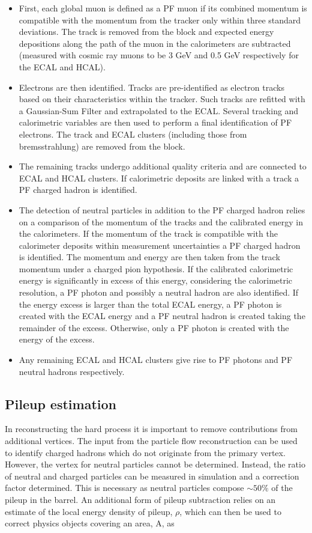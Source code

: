 \begin{itemize}
\item First, each global muon is defined as a PF muon if its combined momentum is compatible with the momentum 
from the tracker only within three standard deviations. The track is removed from the block and expected energy depositions
along the path of the muon in the calorimeters are subtracted (measured with cosmic ray muons to be 3 GeV and 0.5 GeV respectively for the 
ECAL and HCAL).
\item Electrons are then identified. Tracks are pre-identified as electron tracks based on their 
characteristics within the tracker. Such tracks are refitted with a Gaussian-Sum Filter and extrapolated to the ECAL. 
Several tracking and calorimetric variables are then used to perform a final identification of PF electrons. The track
and ECAL clusters (including those from bremsstrahlung) are removed from the block.
\item The remaining tracks undergo additional quality criteria and are connected to ECAL and HCAL clusters. 
If calorimetric deposits are linked with a track a PF charged hadron is identified. 
\item The detection of neutral particles in addition to the PF charged hadron 
relies on a comparison of the momentum of the tracks and the calibrated energy in the calorimeters. 
If the momentum of the track is compatible with the calorimeter deposits within measurement uncertainties 
a PF charged hadron is identified. The momentum and energy are then taken from the track momentum under a 
charged pion hypothesis. If the calibrated calorimetric energy is significantly in excess of this energy, considering
the calorimetric resolution, a PF photon and possibly a neutral hadron are also identified. 
If the energy excess is larger than the total ECAL energy, a PF photon is created with the ECAL energy and a 
PF neutral hadron is created taking the remainder of the excess. Otherwise, only a PF photon is created with the energy of the excess.
\item Any remaining ECAL and HCAL clusters give rise to PF photons and PF neutral hadrons respectively.
\end{itemize}

\subsection{Pileup estimation}

In reconstructing the hard process it is important to remove contributions from additional
vertices. The input from the particle flow reconstruction can be used to identify 
charged hadrons which do not originate from the primary vertex. However, the vertex 
for neutral particles cannot be determined. Instead, the ratio of neutral and 
charged particles can be measured in simulation and a correction factor determined.
This is necessary as neutral particles compose $\sim 50\%$ of the pileup in the barrel.
An additional form of pileup subtraction relies on an estimate of the local energy density 
of pileup, $\rho$, which can then be used to correct physics objects covering an area,
A, as

